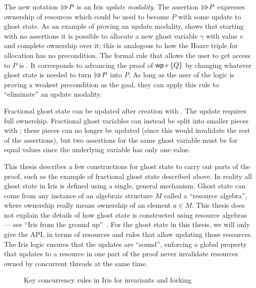 The new notation $\mathop{\mid\kern-0.4ex\Rrightarrow\kern-0.25ex} P$ is an Iris \emph{update modality}. The assertion
$\mathop{\mid\kern-0.4ex\Rrightarrow\kern-0.25ex} P$ expresses ownership of resources which could be used to become $P$ with
some update to ghost state. As an example of proving an update modality,
 shows that starting with no assertions it is possible to
allocate a new ghost variable $\gamma$ with value $v$ and complete ownership
over it; this is analogous to how the Hoare triple for allocation has no
precondition. The formal rule that allows the user to get access to $P$ is
. It corresponds to advancing the proof of $\wpre{e}{Q}$ by
changing whatever ghost state is needed to turn $\mathop{\mid\kern-0.4ex\Rrightarrow\kern-0.25ex} P$ into $P$. As long as
the user of the logic is proving a weakest precondition as the goal, they can
apply this rule to ``eliminate'' an update modality.

Fractional ghost state can be updated after creation with .
The update requires full ownership. Fractional ghost variables can instead be
split into smaller pieces with ; these pieces can no longer
be updated (since this would invalidate the rest of the assertions), but two
assertions for the same ghost variable must be for equal values since the
underlying variable has only one value.

This thesis describes a few constructions for ghost state to carry out parts of
the proof, such as the example of fractional ghost state described above. In reality all
ghost state in Iris is defined using a single, general mechanism. Ghost state
can come from any instance of an algebraic structure $M$ called
a ``resource algebra'', where ownership really means
ownership of an element $a \in M$. This thesis does not explain the details of
how ghost state is constructed using resource algebras --- see
``Iris from the ground up''~\cite{jung:iris-jfp}. For the ghost
state in this thesis, we will only give the API, in terms of resources and
rules that allow updating those resources. The Iris logic ensures that the
updates are ``sound'', enforcing a global property that updates to a resource in
one part of the proof never invalidate resources owned by concurrent threads at
the same time.

\begin{figure}[ht]
  \caption{Key concurrency rules in Iris for invariants and forking}
  \label{fig:invariants}
\end{figure}

